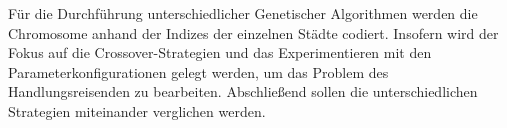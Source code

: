 Für die Durchführung unterschiedlicher Genetischer Algorithmen werden die Chromosome anhand der Indizes der einzelnen Städte codiert.
Insofern wird der Fokus auf die Crossover-Strategien und das Experimentieren mit den Parameterkonfigurationen gelegt werden, um das Problem des Handlungsreisenden zu bearbeiten. Abschließend sollen die unterschiedlichen Strategien miteinander verglichen werden.
